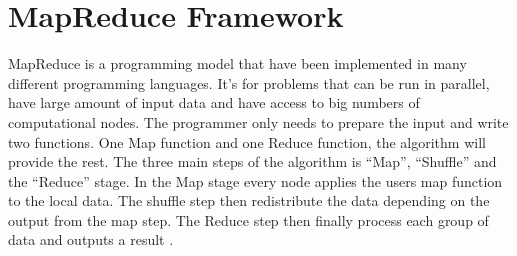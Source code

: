 \section{MapReduce Framework}
MapReduce is a programming model that have been implemented in many different programming languages. It’s for problems that can be run in parallel, have large amount of input data and have access to big numbers of computational nodes. The programmer only needs to prepare the input and write two functions. One Map function and one Reduce function, the algorithm will provide the rest. The three main steps of the algorithm is “Map”, “Shuffle” and the “Reduce” stage. In the Map stage every node applies the users map function to the local data. The shuffle step then redistribute the data depending on the output from the map step. The Reduce step then finally process each group of data and outputs a result \citep{mapreduce}.
